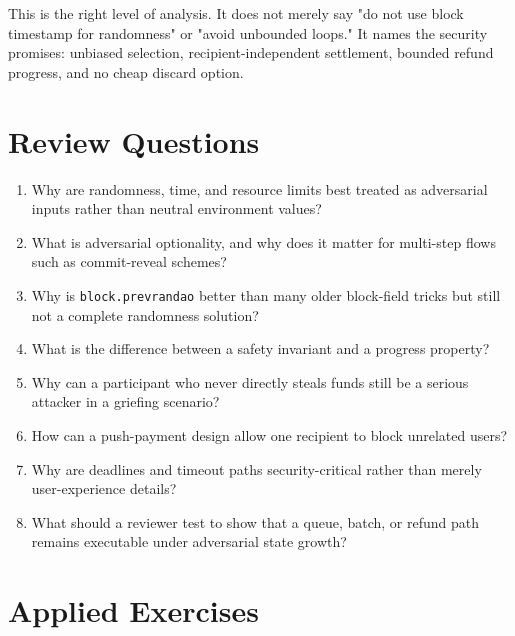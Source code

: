 This is the right level of analysis. It does not merely say "do not use block timestamp for randomness" or "avoid unbounded loops." It names the security promises: unbiased selection, recipient-independent settlement, bounded refund progress, and no cheap discard option.

\section*{Review Questions}

\begin{enumerate}
\item Why are randomness, time, and resource limits best treated as adversarial inputs rather than neutral environment values?
\item What is adversarial optionality, and why does it matter for multi-step flows such as commit-reveal schemes?
\item Why is \texttt{block.prevrandao} better than many older block-field tricks but still not a complete randomness solution?
\item What is the difference between a safety invariant and a progress property?
\item Why can a participant who never directly steals funds still be a serious attacker in a griefing scenario?
\item How can a push-payment design allow one recipient to block unrelated users?
\item Why are deadlines and timeout paths security-critical rather than merely user-experience details?
\item What should a reviewer test to show that a queue, batch, or refund path remains executable under adversarial state growth?
\end{enumerate}

\section*{Applied Exercises}


